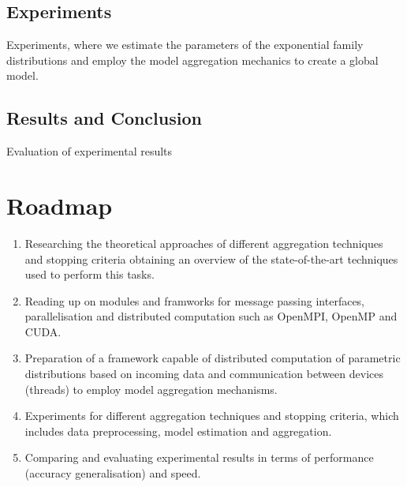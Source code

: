     \subsection{Experiments}
    Experiments, where we estimate the parameters of the exponential family distributions and employ the model aggregation mechanics to create a global model. 
    \subsection{Results and Conclusion}
    Evaluation of experimental results 
    \section{Roadmap}
    \begin{enumerate}
       \item Researching the theoretical approaches of different aggregation techniques and stopping criteria obtaining an overview of the state-of-the-art techniques used to perform this tasks.
       \item Reading up on modules and framworks for message passing interfaces, parallelisation and distributed computation such as OpenMPI, OpenMP and CUDA.
       \item Preparation of a framework capable of distributed computation of parametric distributions based on incoming data and communication between devices (threads) to employ model aggregation mechanisms.
       \item Experiments for different aggregation techniques and stopping criteria, which includes data preprocessing, model estimation and aggregation.
       \item Comparing and evaluating experimental results in terms of performance (accuracy generalisation) and speed.
    \end{enumerate}